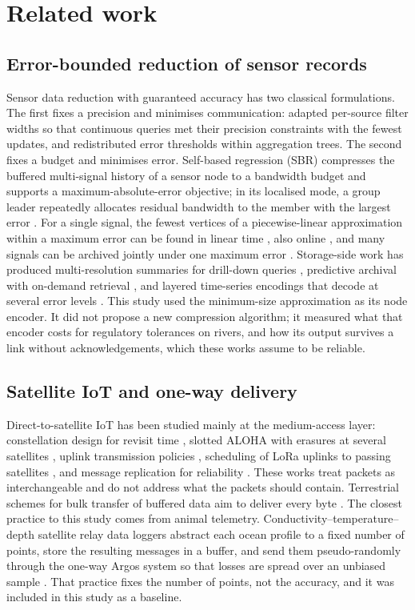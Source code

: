\section{Related work}
\label{sec:related}

\subsection{Error-bounded reduction of sensor records}
Sensor data reduction with guaranteed accuracy has two classical formulations. The first fixes a precision and minimises communication: \citet{olston2003} adapted per-source filter widths so that continuous queries met their precision constraints with the fewest updates, and \citet{deligiannakis2004} redistributed error thresholds within aggregation trees. The second fixes a budget and minimises error. Self-based regression (SBR) compresses the buffered multi-signal history of a sensor node to a bandwidth budget and supports a maximum-absolute-error objective; in its localised mode, a group leader repeatedly allocates residual bandwidth to the member with the largest error \citep{deligiannakis2007}. For a single signal, the fewest vertices of a piecewise-linear approximation within a maximum error can be found in linear time \citep{imai1988}, also online \citep{soroush2008}, and many signals can be archived jointly under one maximum error \citep{gandhi2009}. Storage-side work has produced multi-resolution summaries for drill-down queries \citep{ganesan2003}, predictive archival with on-demand retrieval \citep{desnoyers2005}, and layered time-series encodings that decode at several error levels \citep{barbarioli2023}. This study used the minimum-size approximation as its node encoder. It did not propose a new compression algorithm; it measured what that encoder costs for regulatory tolerances on rivers, and how its output survives a link without acknowledgements, which these works assume to be reliable.

\subsection{Satellite IoT and one-way delivery}
Direct-to-satellite IoT has been studied mainly at the medium-access layer: constellation design for revisit time \citep{capez2022}, slotted ALOHA with erasures at several satellites \citep{tondo2021}, uplink transmission policies \citep{alvarez2022}, scheduling of LoRa uplinks to passing satellites \citep{afhamisis2022}, and message replication for reliability \citep{rathi2025}. These works treat packets as interchangeable and do not address what the packets should contain. Terrestrial schemes for bulk transfer of buffered data aim to deliver every byte \citep{abdelfadeel2020}. The closest practice to this study comes from animal telemetry. Conductivity–temperature–depth satellite relay data loggers abstract each ocean profile to a fixed number of points, store the resulting messages in a buffer, and send them pseudo-randomly through the one-way Argos system so that losses are spread over an unbiased sample \citep{boehme2009,photopoulou2015}. That practice fixes the number of points, not the accuracy, and it was included in this study as a baseline.

